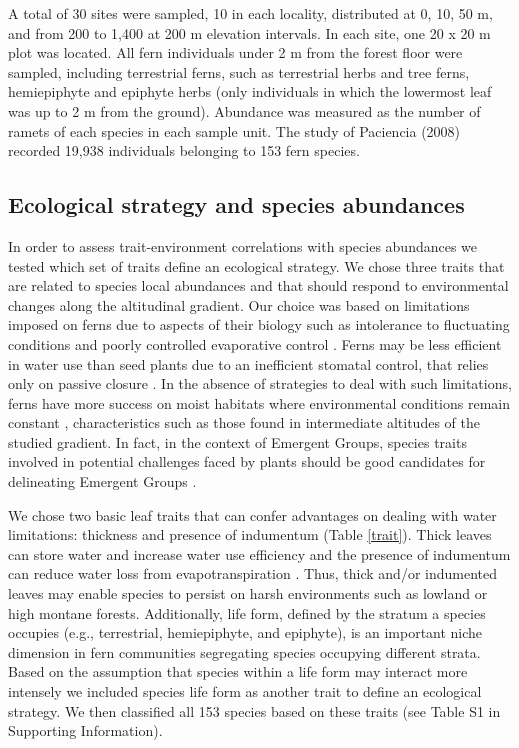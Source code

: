 \documentclass[12pt]{article}
\begin{document}
A total of 30 sites were sampled, 10 in each locality,
distributed at 0, 10, 50 m, and from 200 to 1,400 at 200 m elevation
intervals. In each site, one 20 x 20 m plot was located. 
All fern individuals under 2 m from the forest floor were sampled, including terrestrial ferns, such as terrestrial herbs and tree ferns,
hemiepiphyte and epiphyte herbs (only individuals in which the lowermost leaf was up to 2 m from the ground). 
Abundance was measured as the number
of ramets of each species in each sample unit. The study of Paciencia (2008) 
recorded
19,938 individuals belonging to 153 fern species. 

\subsection*{Ecological strategy and species abundances}

In order to assess trait-environment correlations with species abundances we tested which set of traits define an ecological strategy. We chose three traits
that are related to species local abundances and that 
should respond to environmental changes 
along the altitudinal gradient. 
Our choice was based on limitations imposed on ferns due to aspects of
their biology such as intolerance to fluctuating conditions and poorly
controlled evaporative control \citep{Page2002}. Ferns may be less efficient in 
water use than seed plants due to an inefficient stomatal control, that relies 
only on passive closure \citep{Brodribb2011}. 
In the absence of
strategies to deal with such limitations, ferns have more success on
moist habitats where environmental conditions remain constant
\citep{Page2002}, characteristics such as those found in intermediate altitudes 
of the studied gradient.
In fact, in the context of Emergent Groups, species traits involved in potential 
challenges faced by plants should be good candidates for delineating Emergent Groups 
\citep{Herault2007}.

We chose two basic
leaf traits that can confer advantages on dealing with water limitations:
thickness and presence of 
indumentum (Table \ref{trait}). Thick leaves can store water 
and increase water use efficiency and the presence of indumentum can reduce 
water loss from evapotranspiration \citep{Watkins2012}. Thus, thick and/or
indumented leaves may enable species to persist on harsh environments
such as lowland or high montane forests. 
Additionally, life form, defined by the stratum
a species occupies (e.g., terrestrial, hemiepiphyte, and epiphyte), is an important
niche dimension in fern communities segregating species
occupying different strata. 
Based on the assumption that species within a life form may interact
more intensely we included species life form as another trait to define an 
ecological strategy. We then classified all 153 species based on these traits (see Table S1 in Supporting Information). 
\end{document}
